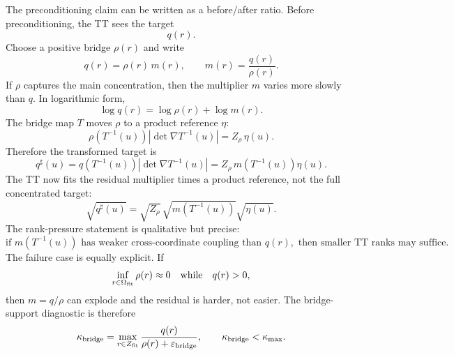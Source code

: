\documentclass[11pt]{article}
\numberwithin{equation}{section}
\begin{document}
The preconditioning claim can be written as a before/after ratio.  Before
preconditioning, the TT sees the target
\begin{equation}
    q(r).
    \label{eq:p24-p23-prec1}
\end{equation}
Choose a positive bridge \(\rho(r)\) and write
\begin{equation}
    q(r)=\rho(r)\,m(r),
    \qquad
    m(r)=\frac{q(r)}{\rho(r)}.
    \label{eq:p24-p23-prec2}
\end{equation}
If \(\rho\) captures the main concentration, then the multiplier \(m\) varies
more slowly than \(q\).  In logarithmic form,
\begin{equation}
    \log q(r)=\log\rho(r)+\log m(r).
    \label{eq:p24-p23-prec3}
\end{equation}
The bridge map \(T\) moves \(\rho\) to a product reference \(\eta\):
\begin{equation}
    \rho(T^{-1}(u))\left|\det\nabla T^{-1}(u)\right|
    =
    Z_\rho\,\eta(u).
    \label{eq:p24-p23-prec4}
\end{equation}
Therefore the transformed target is
\begin{equation}
    q^\sharp(u)
    =
    q(T^{-1}(u))\left|\det\nabla T^{-1}(u)\right|
    =
    Z_\rho\,m(T^{-1}(u))\eta(u).
    \label{eq:p24-p23-prec5}
\end{equation}
The TT now fits the residual multiplier times a product reference, not the
full concentrated target:
\begin{equation}
    \sqrt{q^\sharp(u)}
    =
    \sqrt{Z_\rho}\,
    \sqrt{m(T^{-1}(u))}
    \sqrt{\eta(u)}.
    \label{eq:p24-p23-prec6}
\end{equation}
The rank-pressure statement is qualitative but precise:
\begin{equation}
    \text{if }m(T^{-1}(u))\text{ has weaker cross-coordinate coupling than }q(r),
    \text{ then smaller TT ranks may suffice.}
    \label{eq:p24-p23-prec7}
\end{equation}
The failure case is equally explicit.  If
\begin{equation}
    \inf_{r\in\Omega_{\rm fit}}\rho(r)\approx0
    \quad\text{while}\quad q(r)>0,
    \label{eq:p24-p23-prec8}
\end{equation}
then \(m=q/\rho\) can explode and the residual is harder, not easier.  The
bridge-support diagnostic is therefore
\begin{equation}
    \kappa_{\rm bridge}
    =
    \max_{r\in Z_{\rm fit}}\frac{q(r)}{\rho(r)+\varepsilon_{\rm bridge}},
    \qquad
    \kappa_{\rm bridge}<\kappa_{\max}.
    \label{eq:p24-p23-prec9}
\end{equation}
\end{document}
